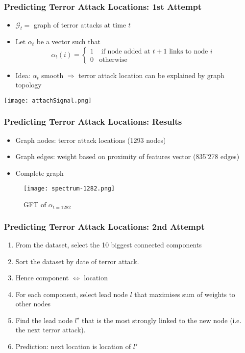 \begin{frame}
\frametitle{Predicting Terror Attack Locations: 1st Attempt}

\begin{itemize}

\item $\mathcal{G}_t = $ graph of terror attacks at time $t$

\item Let $\alpha_t$ be a vector such that
\begin{equation}
\alpha_t(i)= \begin{cases}
1 		& \text{ if node added at } t+1 \text{ links to node }i \\
0		& \text{otherwise}
\end{cases}
\end{equation}

\item Idea: $\alpha_t$ smooth $\Rightarrow$ terror attack location can be explained by graph topology 

\end{itemize}
\begin{center}
\texttt{[image: attachSignal.png]}
\end{center}
\end{frame}

\begin{frame}
\frametitle{Predicting Terror Attack Locations: Results}

\begin{itemize}
\item Graph nodes: terror attack locations (1293 nodes)
\item Graph edges: weight based on proximity of features vector (835'278 edges)
\item Complete graph
\end{itemize}
\begin{figure}[H]
\begin{center}
\texttt{[image: spectrum-1282.png]}
\caption{GFT of $\alpha_{t=1282}$}
\label{fig:spectrum-1282}
\end{center}
\end{figure}

\end{frame}

\begin{frame}
\frametitle{Predicting Terror Attack Locations: 2nd Attempt}
\begin{enumerate}
\item From the dataset, select the 10 biggest connected components
\item Sort the dataset by date of terror attack.
\item Hence component $\Leftrightarrow$ location
\item For each component, select lead node $l$ that maximises sum of weights to other nodes
\item Find the lead node $l^\star$ that is the most strongly linked to the new node (i.e. the next terror attack).
\item Prediction: next location is location of $l^\star$
\end{enumerate}
\end{frame}


